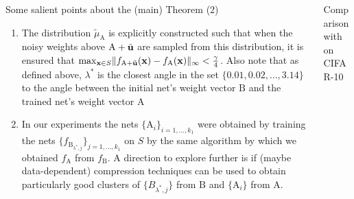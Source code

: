 \documentclass[final,t]{beamer}
\newcommand{\norm}[2][]{#1\lVert #2 #1\rVert}
\def\ve#1{\mathchoice{\mbox{\boldmath$\displaystyle\bf#1$}}
{\mbox{\boldmath$\textstyle\bf#1$}}
{\mbox{\boldmath$\scriptstyle\bf#1$}}
{\mbox{\boldmath$\scriptscriptstyle\bf#1$}}}
\renewcommand{\u}{{\ve u}}
\newcommand{\x}{{\ve x}}
\newcommand{\A}{\textrm{A}}
\newcommand{\B}{\textrm{B}}
\begin{document}
\begin{frame}[containsverbatim]
\begin{columns}[t]
\begin{column}{.32\linewidth}
\begin{exampleblock}{Some salient points about the (main) Theorem ($2$)}
\vspace{12mm} 
\begin{enumerate}
\item The distribution $\tilde{\mu}_{\A}$ is explicitly constructed such that when the noisy weights above $\A +\tilde{\u}$ are sampled from this distribution, it is ensured that $\max_{\x \in S} \norm{ f_{\A + \tilde{\u}} (\x) - f_{\A} (\x)}_\infty < \frac{\gamma}{4}$.
Also note that as defined above, $\lambda^*$ is the closest angle in the set  $\{0.01,0.02,\ldots,3.14\}$ to the angle between the initial net's weight vector $\B$ and the trained net's weight vector $\A$
\vspace{12mm} 
\item In our experiments the nets $\{ \A_i\}_{i=1,\ldots,k_1}$ were obtained by training the nets $\{ f_{\B_{\lambda^*,j}} \}_{j=1,\ldots,k_1}$ on $S$ by the same algorithm by which we obtained $f_{\A}$ from $f_{\B}$. A direction to explore further is if (maybe data-dependent) compression techniques can be used to obtain particularly good clusters of $\{B_{\lambda^*,j}\}$ from $\B$ and $\{\A_i\}$ from $\A$.
\end{enumerate}
\end{exampleblock}


\end{column}








\begin{column}{.32\linewidth}
\vspace{-18mm}

\begin{exampleblock}{Comparison with ~\cite{neyshabur2017pac} on CIFAR-10}


\end{exampleblock}
\end{column}
\end{columns}
\end{frame}
\end{document}

